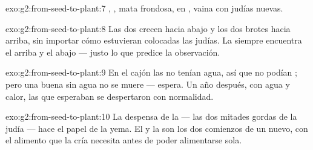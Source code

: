 \begin{solution}{exo:g2:from-seed-to-plant:7}
, , mata frondosa,  en , vaina con judías nuevas.
\end{solution}

\begin{solution}{exo:g2:from-seed-to-plant:8}
Las dos  crecen hacia abajo y los dos brotes hacia arriba, sin
importar cómo estuvieran colocadas las judías. La  siempre
encuentra el arriba y el abajo --- justo lo que predice la observación.
\end{solution}

\begin{solution}{exo:g2:from-seed-to-plant:9}
En el cajón las  no tenían agua, así que no podían ;
pero una  buena sin agua no se muere --- espera. Un año después,
con agua y calor, las  que esperaban se despertaron con normalidad.
\end{solution}

\begin{solution}{exo:g2:from-seed-to-plant:10}
La despensa de la  --- las dos mitades gordas de la judía ---
hace el papel de la yema. El  y la  son los dos comienzos
de un  nuevo, con el alimento que la cría necesita antes de
poder alimentarse sola.
\end{solution}
